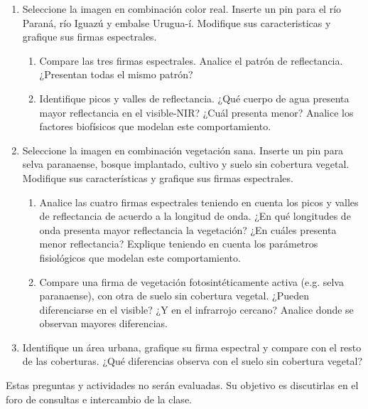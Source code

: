 \begin{enumerate}
  \item Seleccione la imagen en combinación color real. Inserte un pin para el río Paraná, río Iguazú y embalse Urugua-í. Modifique sus caracteristicas y grafique sus firmas espectrales.
  \begin{enumerate}
      \item Compare las tres firmas espectrales. Analice el patrón de reflectancia. ¿Presentan todas el mismo patrón?
      \item Identifique picos y valles de reflectancia. ¿Qué cuerpo de agua presenta mayor reflectancia en el visible-NIR? ¿Cuál presenta menor? Analice los factores biofísicos que modelan este comportamiento.
    \end{enumerate}

  \item Seleccione la imagen en combinación vegetación sana. Inserte un pin para selva paranaense, bosque implantado, cultivo y suelo sin cobertura vegetal. Modifique sus características y grafique sus firmas espectrales.
  \begin{enumerate}
    \item Analice las cuatro firmas espectrales teniendo en cuenta los picos y valles de reflectancia de acuerdo a la longitud de onda. ¿En qué longitudes de onda presenta mayor reflectancia la vegetación? ¿En cuáles presenta menor reflectancia? Explique teniendo en cuenta los parámetros fisiológicos que modelan este comportamiento.
    \item Compare una firma de vegetación fotosintéticamente activa (e.g. selva paranaense), con otra de suelo sin cobertura vegetal. ¿Pueden diferenciarse en el visible? ¿Y en el infrarrojo cercano? Analice donde se observan mayores diferencias.
  \end{enumerate}
	\item Identifique un área urbana, grafique su firma espectral y compare con el resto de las coberturas. ¿Qué diferencias observa con el suelo sin cobertura vegetal?
  \end{enumerate}

Estas preguntas y actividades no serán evaluadas. Su objetivo es discutirlas en el foro de consultas e intercambio de la clase.


